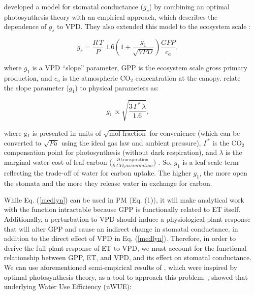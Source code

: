 \documentclass[12pt]{article}
\begin{document}
 developed a model for stomatal conductance ($g_s$)
by combining an optimal photosynthesis theory \cite{Cowan_1977} with
an empirical approach, which describes the dependence of $g_s$ to
VPD. They also extended this model to the ecosystem scale
\cite{Medlyn_2017}:

  \begin{equation}
    g_s = \frac{R \,T}{P} \; 1.6 \left(1 + \frac{g_1}{\sqrt{VPD}}\right) \frac{GPP}{c_a},
    \label{medlyn}
  \end{equation}

  where $g_{1}$ is a VPD ``slope'' parameter, GPP is the ecosystem
  scale gross primary production, and $c_a$ is the atmospheric CO$_2$
  concentration at the canopy. \cite{MEDLYN_2011} relate the slope
  parameter ($g_{1}$) to physical parameters as:

  \begin{equation}
    g_{1}  \propto \sqrt{\frac{3 \, \Gamma^* \,
        \lambda}{1.6}},
    \label{slope}
  \end{equation}


  where g$_1$ is presented in units of $\sqrt{\text{mol fraction}}$ for
  convenience (which can be converted to $\sqrt{Pa}$ using the ideal
  gas law and ambient pressure), $\Gamma^*$ is the CO$_2$ compensation
  point for photosynthesis (without dark respiration), and $\lambda$
  is the marginal water cost of leaf carbon
  ($\frac{\partial \; \text{transpiration}}{\partial \; CO_2
    assimilation}$) \cite{Farquhar_1980, Katul_2009}. So, $g_{1}$ is a
  leaf-scale term reflecting the trade-off of water for carbon
  uptake. The higher $g_{1}$, the more open the stomata and the more
  they release water in exchange for carbon.


While Eq. (\ref{medlyn}) can be used in PM (Eq. (1)), it will make
analytical work with the function intractable because GPP is
functionally related to ET itself. Additionally, a perturbation to VPD
should induce a physiological plant response that will alter GPP and
cause an indirect change in stomatal conductance, in addition to the
direct effect of VPD in Eq. (\ref{medlyn}). Therefore, in order to
derive the full plant response of ET to VPD, we must account for the
functional relationship between GPP, ET, and VPD, and its effect on
stomatal conductance. We can use aforementioned semi-empirical results
of , which were inspired by optimal photosynthesis
theory, as a tool to approach this problem. , showed
that underlying Water Use Efficiency (uWUE):
\end{document}
